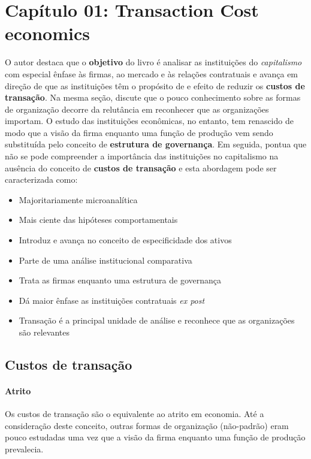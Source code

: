 \section*{Capítulo 01: Transaction Cost economics}

O autor destaca que o \textbf{objetivo} do livro é analisar as instituições do \textit{capitalismo} com especial ênfase às firmas, ao mercado e às relações contratuais e avança em direção de que as instituições têm o propósito de e efeito de reduzir os \textbf{custos de transação}. Na mesma seção, discute que o pouco conhecimento sobre as formas de organização decorre da relutância em reconhecer que as organizações importam. O estudo das instituições econômicas, no entanto, tem renascido de modo que a visão da firma enquanto uma função de produção vem sendo substituída pelo conceito de \textbf{estrutura de governança}. Em seguida, pontua que não se pode compreender a importância das instituições no capitalismo na ausência do conceito de \textbf{custos de transação} e esta abordagem pode ser caracterizada como:

\begin{itemize}
	\item Majoritariamente microanalítica
	\item Mais ciente das hipóteses comportamentais
	\item Introduz e avança no conceito de especificidade dos ativos
	\item Parte de uma análise institucional comparativa
	\item Trata as firmas enquanto uma estrutura de governança
	\item Dá maior ênfase as instituições contratuais \textit{ex post}
	\item Transação é a principal unidade de análise e reconhece que as organizações são relevantes
\end{itemize}

\subsection*{Custos de transação}

\paragraph*{Atrito}

Os custos de transação são o equivalente ao atrito em economia. Até a consideração deste conceito, outras formas de organização (não-padrão) eram pouco estudadas uma vez que a visão da firma enquanto uma função de produção prevalecia.

